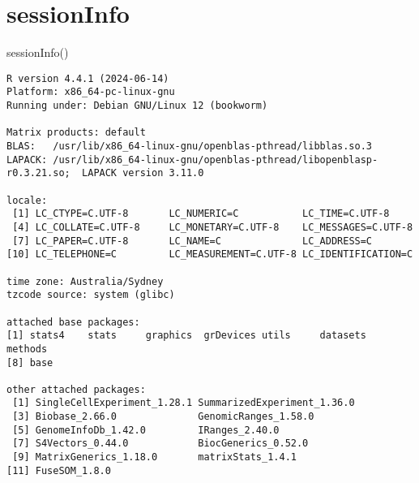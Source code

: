 \documentclass[
  letterpaper,
  DIV=11,
  numbers=noendperiod]{scrreprt}
\newenvironment{Shaded}{\begin{snugshade}}{\end{snugshade}}
\newcommand{\FunctionTok}[1]{\textcolor[rgb]{0.28,0.35,0.67}{#1}}
\newcommand{\NormalTok}[1]{\textcolor[rgb]{0.00,0.23,0.31}{#1}}
\begin{document}
\section{sessionInfo}\label{sessioninfo-2}

\begin{Shaded}
\begin{Highlighting}[]
\FunctionTok{sessionInfo}\NormalTok{()}
\end{Highlighting}
\end{Shaded}

\begin{verbatim}
R version 4.4.1 (2024-06-14)
Platform: x86_64-pc-linux-gnu
Running under: Debian GNU/Linux 12 (bookworm)

Matrix products: default
BLAS:   /usr/lib/x86_64-linux-gnu/openblas-pthread/libblas.so.3 
LAPACK: /usr/lib/x86_64-linux-gnu/openblas-pthread/libopenblasp-r0.3.21.so;  LAPACK version 3.11.0

locale:
 [1] LC_CTYPE=C.UTF-8       LC_NUMERIC=C           LC_TIME=C.UTF-8       
 [4] LC_COLLATE=C.UTF-8     LC_MONETARY=C.UTF-8    LC_MESSAGES=C.UTF-8   
 [7] LC_PAPER=C.UTF-8       LC_NAME=C              LC_ADDRESS=C          
[10] LC_TELEPHONE=C         LC_MEASUREMENT=C.UTF-8 LC_IDENTIFICATION=C   

time zone: Australia/Sydney
tzcode source: system (glibc)

attached base packages:
[1] stats4    stats     graphics  grDevices utils     datasets  methods  
[8] base     

other attached packages:
 [1] SingleCellExperiment_1.28.1 SummarizedExperiment_1.36.0
 [3] Biobase_2.66.0              GenomicRanges_1.58.0       
 [5] GenomeInfoDb_1.42.0         IRanges_2.40.0             
 [7] S4Vectors_0.44.0            BiocGenerics_0.52.0        
 [9] MatrixGenerics_1.18.0       matrixStats_1.4.1          
[11] FuseSOM_1.8.0              


\end{verbatim}
\end{document}
